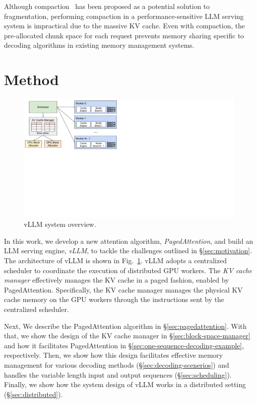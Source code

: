 \documentclass[sigplan,10pt]{acmart}
\newcommand{\tech}[0]{PagedAttention\xspace}
\newcommand{\sys}[0]{vLLM\xspace}
\begin{document}
Although compaction~\cite{wang2022pacman} has been proposed as a potential solution to fragmentation, performing compaction in a performance-sensitive LLM serving system is impractical due to the massive KV cache. Even with compaction, the pre-allocated chunk space for each request prevents memory sharing specific to decoding algorithms in existing memory management systems.

\section{Method}

\begin{figure}
    \centering
    \includegraphics[width=.9\columnwidth]{figures/system-overview.pdf}
    \vspace{-5pt}
    \caption{\sys system overview.} 
    \label{fig:system-overview}
    \vspace{-10pt}
\end{figure}

In this work, we develop a new attention algorithm, \emph{\tech}, and build an LLM serving engine, \emph{\sys}, to tackle the challenges outlined in \S\ref{sec:motivation}. The architecture of \sys is shown in Fig.~\ref{fig:system-overview}. \sys adopts a centralized scheduler to coordinate the execution of distributed GPU workers. The \emph{KV cache manager} effectively manages the KV cache in a paged fashion, enabled by \tech. Specifically, the KV cache manager manages the physical KV cache memory on the GPU workers through the instructions sent by the centralized scheduler.

Next, We describe the \tech algorithm in \S\ref{sec:pagedattention}. With that, we show the design of the KV cache manager in \S\ref{sec:block-space-manager} and how it facilitates \tech in \S\ref{sec:one-sequence-decoding-example}, respectively. Then, we show how this design facilitates effective memory management for various decoding methods (\S\ref{sec:decoding-scenerios}) and handles the variable length input and output sequences (\S\ref{sec:scheduling}). Finally, we show how the system design of \sys works in a distributed setting (\S\ref{sec:distributed}). 
\end{document}
